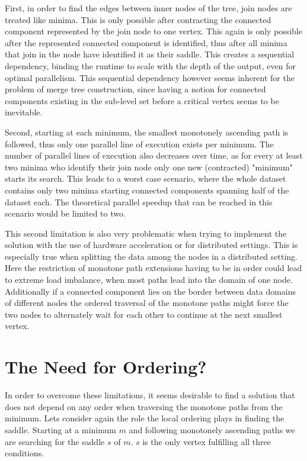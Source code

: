 \documentclass[%
	paper=A4,					%
	twoside=true,				%
	openright,					%
	parskip=full,				%
	chapterprefix=true,			%
	11pt,						%
	headings=normal,			%
	bibliography=totoc,			%
	listof=totoc,				%
	titlepage=on,				%
	captions=tableabove,		%
	draft=false,				%
]{scrreprt}%
\begin{document}
First, in order to find the edges between inner nodes of the tree, join nodes are treated like minima. This is only possible after contracting the connected component represented by the join node to one vertex. This again is only possible after the represented connected component is identified, thus after all minima that join in the node have identified it as their saddle. This creates a sequential dependency, binding the runtime to scale with the depth of the output, even for optimal parallelism. This sequential dependency however seems inherent for the problem of merge tree construction, since having a notion for connected components existing in the sub-level set before a critical vertex seems to be inevitable. 

Second, starting at each minimum, the smallest monotonely ascending path is followed, thus only one parallel line of execution exists per minimum. The number of parallel lines of execution also decreases over time, as for every at least two minima who identify their join node only one new (contracted) "minimum" starts its search. This leads to a worst case scenario, where the whole dataset contains only two minima starting connected components spanning half of the dataset each. The theoretical parallel speedup that can be reached in this scenario would be limited to two.

This second limitation is also very problematic when trying to implement the solution with the use of hardware acceleration or for distributed settings. This is especially true when splitting the data among the nodes in a distributed setting. Here the restriction of monotone path extensions having to be in order could lead to extreme load imbalance, when most paths lead into the domain of one node. Additionally if a connected component lies on the border between data domains of different nodes the ordered traversal of the monotone paths might force the two nodes to alternately wait for each other to continue at the next smallest vertex.

\section{The Need for Ordering?}
In order to overcome these limitations, it seems desirable to find a solution that does not depend on any order when traversing the monotone paths from the minimum. Lets consider again the role the local ordering plays in finding the saddle. Starting at a minimum \(m\) and following monotonely ascending paths we are searching for the saddle \(s\) of \(m\). \(s\) is the only vertex fulfilling all three conditions.
\end{document}
